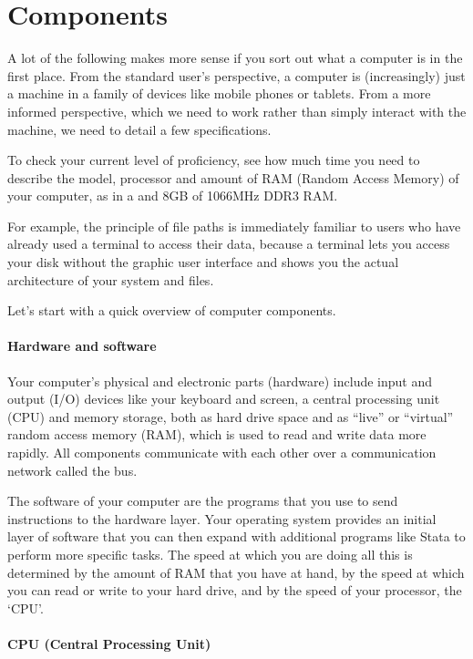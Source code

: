 %
%
\section{Components}

A lot of the following makes more sense if you sort out what a computer is in the first place. From the standard user's perspective, a computer is (increasingly) just a machine in a family of devices like mobile phones or tablets. From a more informed perspective, which we need to work rather than simply interact with the machine, we need to detail a few specifications.

To check your current level of proficiency, see how much time you need to describe the model, processor and amount of RAM (Random Access Memory) of your computer, as in a  and 8GB of 1066MHz DDR3 RAM.

For example, the principle of file paths is immediately familiar to users who have already used a terminal to access their data, because a terminal lets you access your disk without the graphic user interface and shows you the actual architecture of your system and files.

Let's start with a quick overview of computer components.


%
\paragraph{Hardware and software}%

Your computer's physical and electronic parts (hardware) include input and output (I/O) devices like your keyboard and screen, a central processing unit (CPU) and memory storage, both as hard drive space and as ``live'' or ``virtual'' random access memory (RAM), which is used to read and write data more rapidly. All components communicate with each other over a communication network called the bus.%

The software of your computer are the programs that you use to send instructions to the hardware layer. Your operating system provides an initial layer of software that you can then expand with additional programs like Stata to perform more specific tasks. The speed at which you are doing all this is determined by the amount of RAM that you have at hand, by the speed at which you can read or write to your hard drive, and by the speed of your processor, the `CPU'.%


%
\paragraph{CPU (Central Processing Unit)}%

